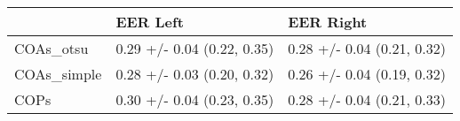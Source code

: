\begin{tabular}{lll}
\toprule
{} &                    EER Left &                   EER Right \\
\midrule
COAs\_otsu   &  0.29 +/- 0.04 (0.22, 0.35) &  0.28 +/- 0.04 (0.21, 0.32) \\
COAs\_simple &  0.28 +/- 0.03 (0.20, 0.32) &  0.26 +/- 0.04 (0.19, 0.32) \\
COPs        &  0.30 +/- 0.04 (0.23, 0.35) &  0.28 +/- 0.04 (0.21, 0.33) \\
\bottomrule
\end{tabular}
